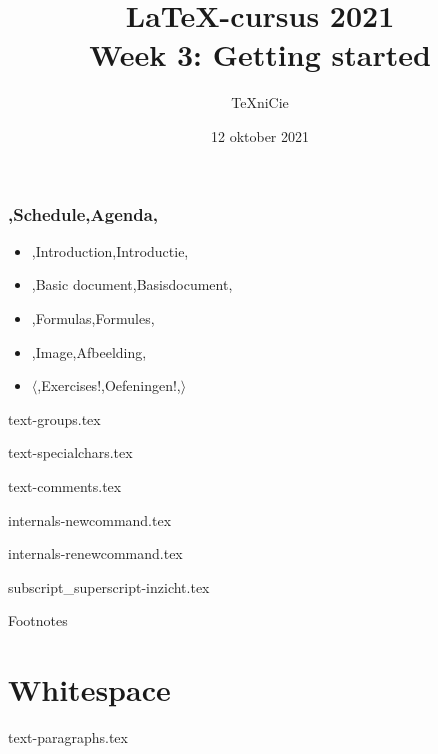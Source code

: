 \documentclass{cursuspresentatie}
\title[LaTeX-cursus 2021 -- Week 3]{%
    \texorpdfstring{\LaTeX{}-cursus 2021\\Week 3: Getting started}{%
        Week 3 -- LaTeX-cursus 2021%
    }%
}
\author{\TeX niCie}
\date{12 oktober 2021}
\def\importslide#1#2{%
    {#2}
}
\begin{document}


\begin{frame}
    \titlepage
    \centering
\end{frame}

\begin{frame}
    \frametitle{\lang,Schedule,Agenda,}
    
    \begin{itemize}
        \item \lang,Introduction,Introductie,
        \item \lang,Basic document,Basisdocument,
        \item \lang,Formulas,Formules,
        \item \lang,Image,Afbeelding,
        \item $ \mathbf\langle $\lang,Exercises!,Oefeningen!,$ \rangle $
    \end{itemize}
\end{frame}

    \clearrecentlist

    \def\assetdir{assets}

    \importslide{text}{text-groups.tex}

    \importslide{text}{text-specialchars.tex}

    \importslide{text}{text-comments.tex}

    \importslide{internals}{internals-newcommand.tex}

    \importslide{internals}{internals-renewcommand.tex}

    \importslide{math}{subscript_superscript-inzicht.tex}

    \begin{frame}
        Footnotes
    \end{frame}

    \section{Whitespace}

    \importslide{text}{text-paragraphs.tex}
\end{document}
